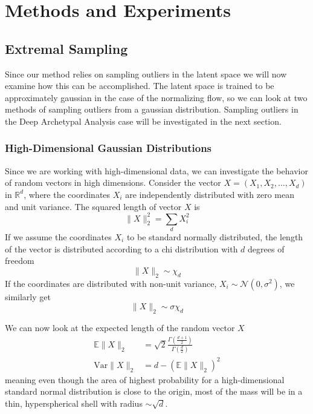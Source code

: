 \chapter{Methods and Experiments}%
\label{cha:methods}


\section{Extremal Sampling}%
\label{sec:extremal_sampling}

Since our method relies on sampling outliers in the latent space we will now
examine how this can be accomplished. The latent space is trained to be
approximately gaussian in the case of the normalizing flow, so we can look at
two methods of sampling outliers from a gaussian distribution. Sampling
outliers in the Deep Archetypal Analysis case will be investigated in the next
section.

\subsection{High-Dimensional Gaussian Distributions}%
\label{sub:high_dimensional_gaussian_distributions}
Since we are working with high-dimensional data, we can investigate the
behavior of random vectors in high dimensions.
Consider the vector $X = (X_1, X_2, \dots, X_d)$ in $\mathbb{R}^d$, where the
coordinates $X_i$ are independently distributed with zero mean and unit
variance. The squared length of vector $X$ is
\begin{equation}%
    \label{eq:square_norm}
    \lVert X \rVert_2^2 = \sum_d X_i^2
\end{equation}
If we assume the coordinates $X_i$ to be standard normally distributed, the
length of the vector is distributed according to a chi distribution with
$d$ degrees of freedom
\begin{equation}%
    \label{eq:sq_norm_chi}
    \lVert X \rVert_2 \sim \chi_d
\end{equation}
If the coordinates are distributed with non-unit variance, $X_i \sim
\mathcal{N}(0, \sigma^2)$, we similarly get
\begin{equation}%
    \label{eq:sq_norm_chi_sigma}
    \lVert X \rVert_2 \sim \sigma\chi_d
\end{equation}

We can now look at the expected length of the random vector $X$
\begin{equation}
    \begin{aligned}%
        \label{eq:mean_var_sq_dist}
        \mathbb{E} \lVert X \rVert_2 &= \sqrt{2} \frac{\Gamma(\frac{d +
        1}{2})}{\Gamma(\frac{d}{2})} \\
        \mathrm{Var} \lVert X \rVert_2 &= d - (\mathbb{E} \lVert X \rVert_2)^2
    \end{aligned}
\end{equation}
meaning even though the area of highest probability for a high-dimensional
standard normal distribution is close to the origin, most of the mass will be
in a thin, hyperspherical shell with radius $\sim \sqrt{d}$.

